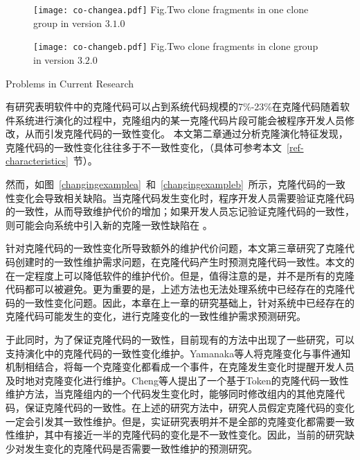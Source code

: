 \begin{figure}[htbp]
\centering
\texttt{[image: co-changea.pdf]}
{Fig.$\!$}{Two clone fragments in one clone group in version $3.1.0$}
\vspace{-1em}
\end{figure}

\begin{figure}[htbp]
\centering
\texttt{[image: co-changeb.pdf]}
{Fig.$\!$}{Two clone fragments in clone group in version $3.2.0$}
\vspace{-1em}
\end{figure}

{Problems in Current Research}

有研究表明软件中的克隆代码可以占到系统代码规模的7\%-23\%\cite{koschke2007survey}在克隆代码随着软件系统进行演化的过程中，克隆组内的某一克隆代码片段可能会被程序开发人员修改，从而引发克隆代码的一致性变化\cite{saha2011automatic}。
本文第二章通过分析克隆演化特征发现，克隆代码的一致性变化往往多于不一致性变化，（具体可参考本文~\ref{ref-characteristics}~节）。

然而，如图~\ref{changingexamplea}~和~\ref{changingexampleb}~所示，克隆代码的一致性变化会导致相关缺陷。当克隆代码发生变化时，程序开发人员需要验证克隆代码的一致性，从而导致维护代价的增加；如果开发人员忘记验证克隆代码的一致性，则可能会向系统中引入新的克隆一致性缺陷在\cite{bettenburg2009empirical} \cite {juergens2009code}。

针对克隆代码的一致性变化所导致额外的维护代价问题，本文第三章研究了克隆代码创建时的一致性维护需求问题，在克隆代码产生时预测克隆代码一致性。本文的在一定程度上可以降低软件的维护代价。但是，值得注意的是，并不是所有的克隆代码都可以被避免。更为重要的是，上述方法也无法处理系统中已经存在的克隆代码的一致性变化问题。因此，本章在上一章的研究基础上，针对系统中已经存在的克隆代码可能发生的变化，进行克隆变化的一致性维护需求预测研究。

于此同时，为了保证克隆代码的一致性，目前现有的方法中出现了一些研究，可以支持演化中的克隆代码的一致性变化维护。Yamanaka等人\cite{yamanaka2013applying}将克隆变化与事件通知机制相结合，将每一个克隆变化都看成一个事件，在克隆发生变化时提醒开发人员及时地对克隆变化进行维护。Cheng等人\cite{cheng2016rule}提出了一个基于Token的克隆代码一致性维护方法，当克隆组内的一个代码发生变化时，能够同时修改组内的其他克隆代码，保证克隆代码的一致性。在上述的研究方法中，研究人员假定克隆代码的变化一定会引发其一致性维护。但是，实证研究表明并不是全部的克隆变化都需要一致性维护，其中有接近一半的克隆代码的变化是不一致性变化。因此，当前的研究缺少对发生变化的克隆代码是否需要一致性维护的预测研究。

